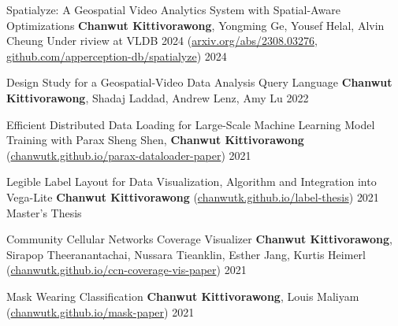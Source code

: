 

\begin{cvpubs}

  \cvpub
    {Spatialyze: A Geospatial Video Analytics System with Spatial-Aware Optimizations} %
    {\textbf{Chanwut Kittivorawong}, Yongming Ge, Yousef Helal, Alvin Cheung Under riview at VLDB 2024 (\href{https://arxiv.org/abs/2308.03276}{arxiv.org/abs/2308.03276}, \href{https://github.com/apperception-db/spatialyze}{github.com/apperception-db/spatialyze})} %
    {2024} %
    {} %
    
  \cvpub
    {Design Study for a Geospatial-Video Data Analysis Query Language} %
    {\textbf{Chanwut Kittivorawong}, Shadaj Laddad, Andrew Lenz, Amy Lu} %
    {2022} %
    {} %

  \cvpub
    {Efficient Distributed Data Loading for Large-Scale Machine Learning Model Training with Parax} %
    {Sheng Shen, \textbf{Chanwut Kittivorawong} (\href{https://chanwutk.github.io/parax-dataloader-paper}{chanwutk.github.io/parax-dataloader-paper})} %
    {2021} %
    {} %

  \cvpub
    {Legible Label Layout for Data Visualization, Algorithm and Integration into Vega-Lite} %
    {\textbf{Chanwut Kittivorawong} (\href{https://chanwutk.github.io/label-thesis}{chanwutk.github.io/label-thesis})} %
    {2021} %
    {Master's Thesis} %

  \cvpub
    {Community Cellular Networks Coverage Visualizer} %
    {\textbf{Chanwut Kittivorawong}, Sirapop Theeranantachai, Nussara Tieanklin, Esther Jang, Kurtis Heimerl (\href{https://chanwutk.github.io/ccn-coverage-vis-paper}{chanwutk.github.io/ccn-coverage-vis-paper})} %
    {2021} %
    {} %

  \cvpub
    {Mask Wearing Classification} %
    {\textbf{Chanwut Kittivorawong}, Louis Maliyam (\href{https://chanwutk.github.io/mask-paper}{chanwutk.github.io/mask-paper})} %
    {2021} %
    {} %


\end{cvpubs}
